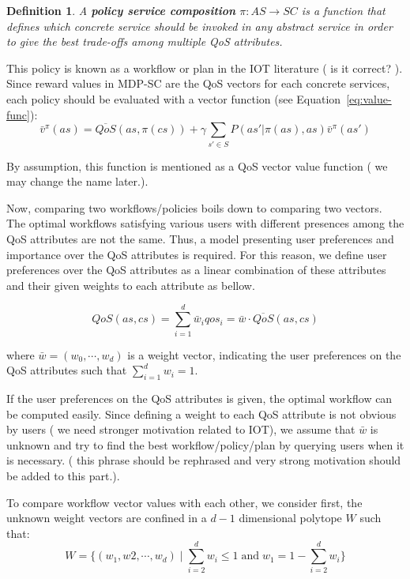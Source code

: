 \documentclass{sigchi}
\newtheorem{definition}{Definition}
\begin{document}
\begin{definition}
A \textbf{policy service composition} $\pi: AS \longrightarrow SC$ is a function that defines which concrete service should be invoked in any abstract service in order to give the best trade-offs among multiple QoS attributes. 
\end{definition}

This policy is known as a workflow or plan in the IOT literature ( {\color{red} is it correct? }). Since reward values in MDP-SC are the QoS vectors for each concrete services, each policy should be evaluated with a vector function (see Equation~\ref{eq:value-func}):
\begin{equation}
\bar{v}^{\pi}(as) = \overline{QoS}(as, \pi(cs)) + \gamma \sum_{s' \in S} P(as' | \pi(as), as) \bar{v}^{\pi}(as')
\end{equation}

By assumption, this function is mentioned as a QoS vector value function ({\color{red} we may change the name later.}). 

Now, comparing two workflows/policies boils down to comparing two vectors. The optimal workflows satisfying various users with different presences among the QoS attributes are not the same. Thus, a model presenting user preferences and importance over the QoS attributes is required. For this reason, we define user preferences over the QoS attributes as a linear combination of these attributes and their given weights to each attribute as bellow. 

\begin{equation}
QoS(as, cs) = \sum_{i=1}^d \bar{w}_i qos_i = \bar{w} \cdot \overline{QoS}(as, cs) 
\end{equation} 

where $\bar{w} = (w_0, \cdots, w_d) $ is a weight vector, indicating the user preferences on the QoS attributes such that $\sum_{i=1}^d w_i = 1$.

If the user preferences on the QoS attributes is given, the optimal workflow can be computed easily. Since defining a weight to each QoS attribute is not obvious by users ({\color{red} we need stronger motivation related to IOT}), we assume that $\bar{w}$ is unknown and try to find the best workflow/policy/plan by querying users when it is necessary. ({\color{red} this phrase should be rephrased and very strong motivation should be added to this part.}). 

To compare workflow vector values with each other, we consider first, the unknown weight vectors are confined in a $d-1$ dimensional polytope $W$ such that:
\begin{equation}
W = \{ (w_1, w2, \cdots, w_d) \; | \; \sum_{i=2}^d w_i \leq 1 \; \text{and} \; w_1 = 1-\sum_{i=2}^d w_i \}
\end{equation}
\end{document}
